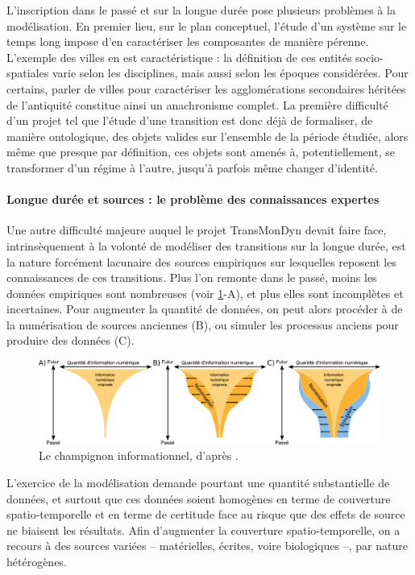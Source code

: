 L'inscription dans le passé et sur la longue durée pose plusieurs problèmes à la modélisation.
En premier lieu, sur le plan conceptuel, l'étude d'un système sur le temps long impose d'en caractériser les composantes de manière pérenne.
L'exemple des \og villes \og en est caractéristique :
	la définition de ces entités socio-spatiales varie selon les disciplines, mais aussi selon les époques considérées.
Pour certains, parler de villes pour caractériser les agglomérations secondaires héritées de l'antiquité constitue ainsi un anachronisme complet.
La première difficulté d'un projet tel que l'étude d'une transition est donc déjà de formaliser, de manière ontologique, des objets valides sur l'ensemble de la période étudiée, alors même que presque par définition, ces objets sont amenés à, potentiellement, se transformer d'un régime à l'autre, jusqu'à parfois même changer d'identité.

\paragraph{Longue durée et sources : le problème des \og connaissances expertes\fg{}}

Une autre difficulté majeure auquel le projet TransMonDyn devait faire face, intrinsèquement à la volonté de modéliser des transitions sur la longue durée, est la nature forcément lacunaire des sources empiriques sur lesquelles reposent les connaissances de ces transitions.
Plus l'on remonte dans le passé, moins les données empiriques sont nombreuses (voir \cref{fig:champignon-kaplan}-A), et plus elles sont incomplètes et incertaines.
Pour augmenter la quantité de données, on peut alors procéder à de la numérisation de sources anciennes (B), ou simuler les processus anciens pour produire des données (C).

\begin{figure}[H]
	\centering
	\includegraphics[width=\linewidth]{img/champignon_informationnel_kaplan.pdf}
	\caption{Le \og champignon informationnel\fg{}, d'après \textcite{kaplan_lancement_2013}.}
	\label{fig:champignon-kaplan}
\end{figure}

L'exercice de la modélisation demande pourtant une quantité substantielle de données, et surtout que ces données soient homogènes en terme de couverture spatio-temporelle et en terme de certitude face au risque que des \og effets de source\fg{} ne biaisent les résultats.
Afin d'augmenter la couverture spatio-temporelle, on a recours à des sources variées -- matérielles, écrites, voire biologiques --, par nature hétérogènes.

